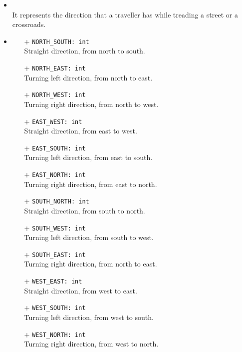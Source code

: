 \begin{itemize}
  \item \textbf{\descr} \\
    It represents the direction that a traveller has while treading a
    street or a crossroads.
  \item \textbf{}
  \begin{itemize}
    \item[+] \texttt{NORTH\_SOUTH: int} \\
    Straight direction, from north to south.
    \item[+] \texttt{NORTH\_EAST: int} \\
    Turning left direction, from north to east.
    \item[+] \texttt{NORTH\_WEST: int} \\
    Turning right direction, from north to west.
    \item[+] \texttt{EAST\_WEST: int} \\
    Straight direction, from east to west.
    \item[+] \texttt{EAST\_SOUTH: int} \\
    Turning left direction, from east to south.
    \item[+] \texttt{EAST\_NORTH: int} \\
    Turning right direction, from east to north.
    \item[+] \texttt{SOUTH\_NORTH: int} \\
    Straight direction, from south to north.
    \item[+] \texttt{SOUTH\_WEST: int} \\
    Turning left direction, from south to west.
    \item[+] \texttt{SOUTH\_EAST: int} \\
    Turning right direction, from north to east.
    \item[+] \texttt{WEST\_EAST: int} \\
    Straight direction, from west to east.
    \item[+] \texttt{WEST\_SOUTH: int} \\
    Turning left direction, from west to south.
    \item[+] \texttt{WEST\_NORTH: int} \\
    Turning right direction, from west to north.
  \end{itemize}
\end{itemize}